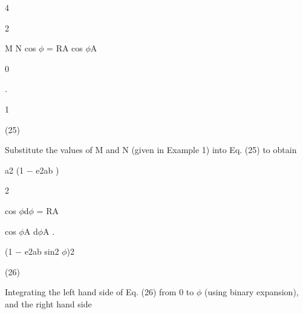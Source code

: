 \documentclass[a4paper,portrait,12pt]{article}
\begin{document}
4


2


\begin{flushleft}
M N cos $\phi$ = RA cos $\phi$A \newpage

\end{flushleft}


\newpage










\newpage



0\newpage



\newpage



\newpage
 .


\newpage



1\newpage






(25)





\begin{flushleft}
Substitute the values of M and N (given in Example 1) into Eq. (25) to obtain
\end{flushleft}


\begin{flushleft}
a2 (1 $-$ e2ab )
\end{flushleft}


2


\begin{flushleft}
cos $\phi$d$\phi$ = RA
\end{flushleft}


\begin{flushleft}
cos $\phi$A d$\phi$A .
\end{flushleft}


\begin{flushleft}
(1 $-$ e2ab sin2 $\phi$)2
\end{flushleft}





(26)





\begin{flushleft}
Integrating the left hand side of Eq. (26) from 0 to $\phi$ (using binary expansion), and the right hand side
\end{flushleft}
\end{document}
